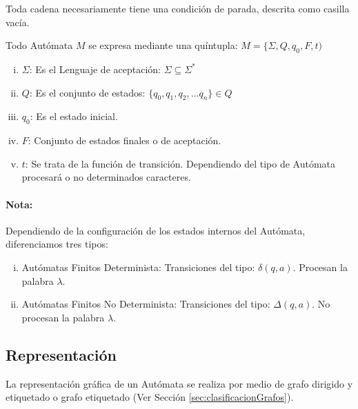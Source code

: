 

 Toda cadena necesariamente tiene una condición de parada, descrita como casilla vacía.

 Todo Autómata $M$ se expresa mediante una quíntupla: $M = \{\Sigma, Q, q_0, F, t)$ 

\begin{enumerate}[i.]

\item $\Sigma$: Es el Lenguaje de aceptación: $\Sigma \subseteq \Sigma^*$

\item $Q$: Es el conjunto de estados: $\{q_0, q_1, q_2, \ldots q_n\} \in Q$

\item $q_0$: Es el estado inicial.

\item $F$: Conjunto de estados finales o de aceptación.

\item $t$: Se trata de la función de transición. Dependiendo del tipo de Autómata procesará o no determinados caracteres.

\end{enumerate}

\paragraph*{Nota:} Dependiendo de la configuración de los estados internos del Autómata, diferenciamos tres tipos:

\begin{enumerate}[i.]

\item Autómatas Finitos Determinista: Transiciones del tipo: $\delta (q, a)$. Procesan la palabra $\lambda$.

\item Autómatas Finitos No Determinista: Transiciones del tipo: $\Delta (q, a)$. No procesan la palabra $\lambda$.

\end{enumerate}

\subsection{Representación}

La representación gráfica de un Autómata se realiza por medio de grafo dirigido y etiquetado o grafo etiquetado (Ver Sección \ref{sec:clasificacionGrafos}). 

